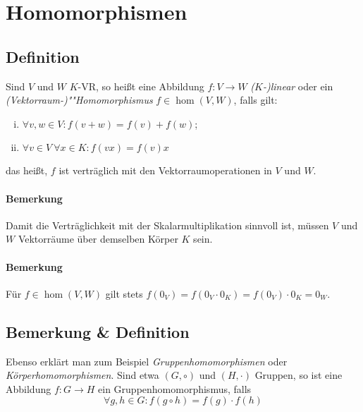 \section{Homomorphismen}
\subsection{Definition}
	\begin{Definition}[Homomorphismus]
		Sind $ V $ und $ W $ $ K $-VR, so heißt eine Abbildung $f: V \rightarrow W$ \emph{($K$-)linear} oder ein \emph{(Vektorraum-)""Homomorphismus} $f\in \hom(V,W)$, falls gilt:

                \begin{enumerate}[(i)]
                        \item $\forall v,w \in V: f(v+w) = f(v) + f(w)$;
                        \item $\forall v\in V\ \forall x\in K: f(vx) = f(v)x$
                \end{enumerate}

                das heißt, $ f $ ist verträglich mit den Vektorraumoperationen in $ V $ und $ W $.
	\end{Definition}

\paragraph{Bemerkung}
	Damit die Verträglichkeit mit der Skalarmultiplikation sinnvoll ist, müssen $ V $ und $ W $ Vektorräume über demselben Körper $ K $ sein.

\paragraph{Bemerkung}
	Für $f\in \hom(V,W)$ gilt stets $f(0_V) = f(0_V\cdot0_K) = f(0_V)\cdot0_K = 0_W$.

\subsection{Bemerkung \& Definition}
        Ebenso erklärt man zum Beispiel \emph{Gruppenhomomorphismen} oder \emph{Körperhomomorphismen}. Sind etwa $(G,\circ)$ und $(H,\cdot)$ Gruppen, so ist eine Abbildung $f: G \to H$ ein Gruppenhomomorphismus, falls
        \begin{equation*}
            \forall g,h \in G: f(g\circ h) = f(g) \cdot f(h)
        \end{equation*}
  
